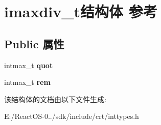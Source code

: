 \hypertarget{structimaxdiv__t}{}\section{imaxdiv\+\_\+t结构体 参考}
\label{structimaxdiv__t}
\subsection*{Public 属性}
\begin{DoxyCompactItemize}
\item 
\mbox{\label{structimaxdiv__t_a9339814cbb7610c72fb7d30c6573b393}} 
intmax\+\_\+t {\bfseries quot}
\item 
\mbox{\label{structimaxdiv__t_a6c9701ad10bff81edae7ff679cae7850}} 
intmax\+\_\+t {\bfseries rem}
\end{DoxyCompactItemize}


该结构体的文档由以下文件生成\+:\begin{DoxyCompactItemize}
\item 
E\+:/\+React\+O\+S-\/0../sdk/include/crt/inttypes.\+h\end{DoxyCompactItemize}
